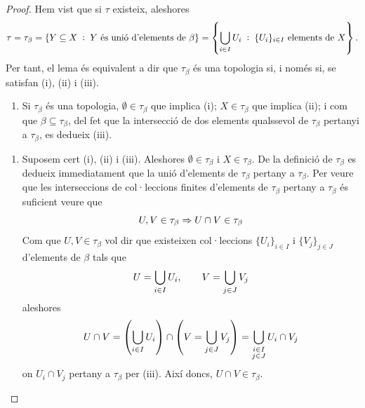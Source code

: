 \documentclass[../main.tex]{subfiles}
\begin{document}
\begin{proof}
Hem vist que si $\tau$ existeix, aleshores 
\begin{equation}
    \notag
    \tau = \tau_\beta = \{Y\subseteq X\;:\;Y\text{ és unió d'elements de $\beta$}\} = \left\{\bigcup_{i\in I} U_i\;:\;\{U_i\}_{i\in I}\text{ elements de $X$}\right\}.
\end{equation}
Per tant, el lema és equivalent a dir que $\tau_\beta$ és una topologia si, i només si, se satisfan (i), (ii) i (iii).
\begin{enumerate}[($\Rightarrow$)]
    \item Si $\tau_\beta$ és una topologia, $\emptyset\in \tau_\beta$ que implica (i); $X\in\tau_\beta$ que implica (ii); i com que $\beta\subseteq\tau_\beta$, del fet que la intersecció de dos elements qualssevol de $\tau_\beta$ pertanyi a $\tau_\beta$, es dedueix (iii).
\end{enumerate}
\begin{enumerate}[($\Leftarrow$)]
    \item Suposem cert (i), (ii) i (iii). Aleshores $\emptyset\in\tau_\beta$ i $X\in\tau_\beta$. De la definició de $\tau_\beta$ es dedueix immediatament que la unió d'elements de $\tau_\beta$ pertany a $\tau_\beta$. Per veure que les interseccions de col·leccions finites d'elements de $\tau_\beta$ pertany a $\tau_\beta$ és suficient veure que 
    \begin{equation}
        \notag
        U,V\in\tau_\beta\Rightarrow U\cap V\in\tau_\beta
    \end{equation}
    Com que $U,V\in\tau_\beta$ vol dir que existeixen col·leccions $\{U_i\}_{i\in I}$ i $\{V_j\}_{j\in J}$ d'elements de $\beta$ tals que
    \begin{equation}
        \notag
        U = \bigcup_{i\in I} U_i,\qquad V = \bigcup_{j\in J} V_j
    \end{equation}
    aleshores
    \begin{equation}
        \notag
        U\cap V = \left(\bigcup_{i\in I} U_i\right)\cap\left(V = \bigcup_{j\in J} V_j\right) = \bigcup_{\substack{i\in I\\j\in J}} U_i\cap V_j
    \end{equation}
    on $U_i\cap V_j$ pertany a $\tau_\beta$ per (iii). Així doncs, $U\cap V\in\tau_\beta$.
\end{enumerate}
\end{proof}
\end{document}
